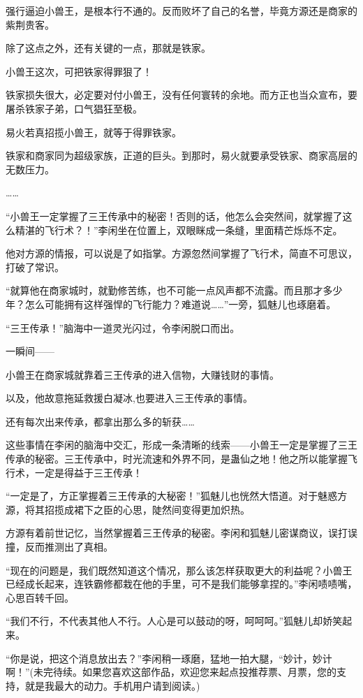 \begin{this_body}
强行逼迫小兽王，是根本行不通的。反而败坏了自己的名誉，毕竟方源还是商家的紫荆贵客。

除了这点之外，还有关键的一点，那就是铁家。

小兽王这次，可把铁家得罪狠了！

铁家损失很大，必定要对付小兽王，没有任何寰转的余地。而方正也当众宣布，要屠杀铁家子弟，口气猖狂至极。

易火若真招揽小兽王，就等于得罪铁家。

铁家和商家同为超级家族，正道的巨头。到那时，易火就要承受铁家、商家高层的无数压力。

……

“小兽王一定掌握了三王传承中的秘密！否则的话，他怎么会突然间，就掌握了这么精湛的飞行术？！”李闲坐在位置上，双眼眯成一条缝，里面精芒烁烁不定。

他对方源的情报，可以说是了如指掌。方源忽然间掌握了飞行术，简直不可思议，打破了常识。

“就算他在商家城时，就勤修苦练，也不可能一点风声都不流露。而且那才多少年？怎么可能拥有这样强悍的飞行能力？难道说……”一旁，狐魅儿也琢磨着。

“三王传承！”脑海中一道灵光闪过，令李闲脱口而出。

一瞬间——

小兽王在商家城就靠着三王传承的进入信物，大赚钱财的事情。

以及，他故意拖延救援白凝冰,也要进入三王传承的事情。

还有每次出来传承，都拿出那么多的斩获……

这些事情在李闲的脑海中交汇，形成一条清晰的线索——小兽王一定是掌握了三王传承的秘密。三王传承中，时光流速和外界不同，是蛊仙之地！他之所以能掌握飞行术，一定是得益于三王传承！

“一定是了，方正掌握着三王传承的大秘密！”狐魅儿也恍然大悟道。对于魅惑方源，将其招揽成裙下之臣的心思，陡然间变得更加炽热。

方源有着前世记忆，当然掌握着三王传承的秘密。李闲和狐魅儿密谋商议，误打误撞，反而推测出了真相。

“现在的问题是，我们既然知道这个情况，那么该怎样获取更大的利益呢？小兽王已经成长起来，连铁霸修都栽在他的手里，可不是我们能够拿捏的。”李闲啧啧嘴，心思百转千回。

“我们不行，不代表其他人不行。人心是可以鼓动的呀，呵呵呵。”狐魅儿却娇笑起来。

“你是说，把这个消息放出去？”李闲稍一琢磨，猛地一拍大腿，“妙计，妙计啊！”(未完待续。如果您喜欢这部作品，欢迎您来起点投推荐票、月票，您的支持，就是我最大的动力。手机用户请到阅读。)

\end{this_body}

